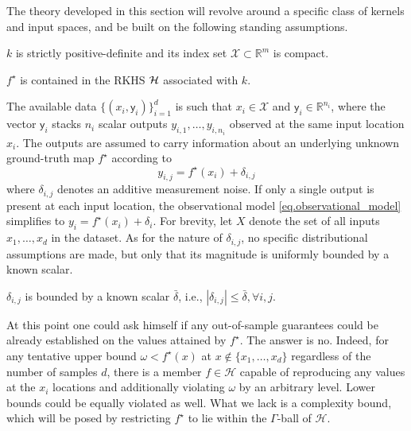 The theory developed in this section will revolve around a specific class of kernels and input spaces, and be built on the following standing assumptions.

\begin{assumption}
	\label{as:kernel_spd_compact_X}
	 $k$ is strictly positive-definite and its index set $\mathcal{X} \subset \mathbb{R}^m$ is compact.
\end{assumption}

\begin{assumption}
	\label{as:rkhs_contains_gt}
	$f^\star$ is contained in the RKHS $\mathcal{H}$ associated with $k$.
\end{assumption}


The available data $\{(x_i,\mathsf{y}_i)\}_{i=1}^d$ is such that $x_i \in \mathcal{X}$ and $\mathsf{y}_i \in \mathbb{R}^{n_i}$, where the vector $\mathsf{y}_i$ stacks $n_i$ scalar outputs $y_{i,1}, \dots, y_{i,n_i}$ observed at the same input location $x_i$. The outputs are assumed to carry information about an underlying unknown ground-truth map $f^\star$ according to
\begin{equation}
	\label{eq.observational_model}
	y_{i,j} = f^\star(x_i) + \delta_{i,j}
\end{equation}
where $\delta_{i,j}$ denotes an additive measurement noise. If only a single output is present at each input location, the observational model \eqref{eq.observational_model} simplifies to $y_{i} = f^\star(x_i) + \delta_{i}$. For brevity, let $X$ denote the set of all inputs $x_1,\dots,x_d$ in the dataset. As for the nature of $\delta_{i,j}$, no specific distributional assumptions are made, but only that its magnitude is uniformly bounded by a known scalar.

\begin{assumption}
	\label{as:noisebound}
	$\delta_{i,j}$ is bounded by a known scalar $\bar{\delta}$, i.e., $|\delta_{i,j}| \leq \bar \delta, \forall i,j$.
\end{assumption}

At this point one could ask himself if any out-of-sample guarantees could be already established on the values attained by $f^\star$. The answer is no. Indeed, for any tentative upper bound $\omega < f^\star(x)$ at $x \not \in \{x_1,\dots,x_d\}$ regardless of the number of samples $d$, there is a member $f \in \mathcal{H}$ capable of reproducing any values at the $x_i$ locations and additionally violating $\omega$ by an arbitrary level. Lower bounds could be equally violated as well. What we lack is a complexity bound, which will be posed by restricting $f^\star$ to lie within the $\Gamma$-ball of $\mathcal{H}$.

